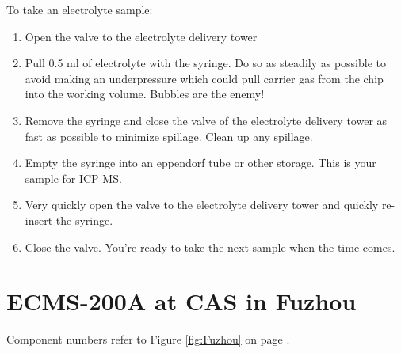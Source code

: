 To take an electrolyte sample:
\begin{enumerate}
\item Open the valve to the electrolyte delivery tower

\item Pull 0.5 ml of electrolyte with the syringe. Do so as steadily as possible to avoid making an underpressure which could pull carrier gas from the chip into the working volume. Bubbles are the enemy!

\item Remove the syringe and close the valve of the electrolyte delivery tower as fast as possible to minimize spillage. Clean up any spillage.

\item Empty the syringe into an eppendorf tube or other storage. This is your sample for ICP-MS.

\item Very quickly open the valve to the electrolyte delivery tower and quickly re-insert the syringe.

\item Close the valve. You're ready to take the next sample when the time comes.
\end{enumerate}


\section{ECMS-200A at CAS in Fuzhou}\label{app:Fuzhou}

Component numbers refer to Figure \ref{fig:Fuzhou} on page \pageref{fig:Fuzhou}.

